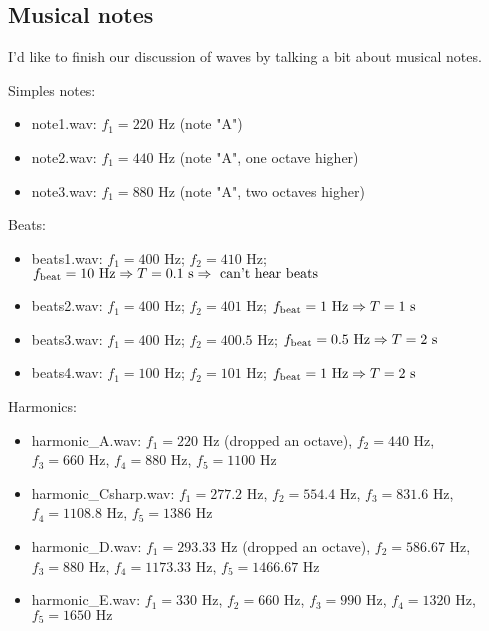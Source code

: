 \subsection{Musical notes}
I'd like to finish our discussion of waves by talking a bit about musical notes.

Simples notes:
\begin{itemize}
\item note1.wav: $f_1=220\mbox{ Hz}$ (note "A")
\item note2.wav: $f_1=440\mbox{ Hz}$ (note "A", one octave higher)
\item note3.wav: $f_1=880\mbox{ Hz}$ (note "A", two octaves higher)
\end{itemize}

Beats:
\begin{itemize}
\item beats1.wav: $f_1=400\mbox{ Hz}$; $f_2=410\mbox{ Hz}$; $f_{\rm beat}=10\mbox{ Hz} \Rightarrow T=0.1\mbox{ s} \Rightarrow \mbox{ can't hear beats}$
\item beats2.wav: $f_1=400\mbox{ Hz}$; $f_2=401\mbox{ Hz}$; $f_{\rm beat}=1\mbox{ Hz} \Rightarrow T=1\mbox{ s}$
\item beats3.wav: $f_1=400\mbox{ Hz}$; $f_2=400.5\mbox{ Hz}$; $f_{\rm beat}=0.5\mbox{ Hz} \Rightarrow T=2\mbox{ s}$
\item beats4.wav: $f_1=100\mbox{ Hz}$; $f_2=101\mbox{ Hz}$; $f_{\rm beat}=1\mbox{ Hz} \Rightarrow T=2\mbox{ s}$
\end{itemize}

Harmonics:
\begin{itemize}
\item harmonic\_A.wav: $f_1=220\mbox{ Hz}$ (dropped an octave), $f_2=440\mbox{ Hz}$, $f_3=660\mbox{ Hz}$, $f_4=880\mbox{ Hz}$, $f_5=1100\mbox{ Hz}$
\item harmonic\_Csharp.wav: $f_1=277.2\mbox{ Hz}$, $f_2=554.4\mbox{ Hz}$, $f_3=831.6\mbox{ Hz}$, $f_4=1108.8\mbox{ Hz}$, $f_5=1386\mbox{ Hz}$
\item harmonic\_D.wav: $f_1=293.33\mbox{ Hz}$ (dropped an octave), $f_2=586.67\mbox{ Hz}$, $f_3=880\mbox{ Hz}$, $f_4=1173.33\mbox{ Hz}$, $f_5=1466.67\mbox{ Hz}$
\item harmonic\_E.wav: $f_1=330\mbox{ Hz}$, $f_2=660\mbox{ Hz}$, $f_3=990\mbox{ Hz}$, $f_4=1320\mbox{ Hz}$, $f_5=1650\mbox{ Hz}$
\end{itemize}

